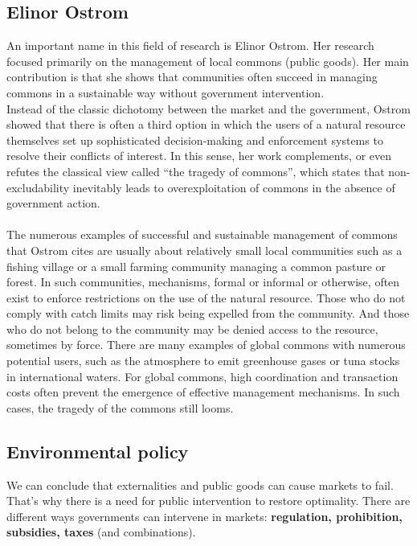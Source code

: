 \documentclass[../summary.tex]{subfiles}
\begin{document}
\subsection{Elinor Ostrom}

An important name in this field of research is Elinor Ostrom. Her research focused primarily on the management of local commons (public goods). Her main contribution is that she shows that communities often succeed in managing commons in a sustainable way without government intervention.
\\
Instead of the classic dichotomy between the market and the government, Ostrom showed that there is often a third option in which the users of a natural resource themselves set up sophisticated decision-making and enforcement systems to resolve their conflicts of interest. In this sense, her work complements, or even refutes the classical view called ``the tragedy of commons'', which states that non-excludability inevitably leads to overexploitation of commons in the absence of government action.
\\\\
The numerous examples of successful and sustainable management of commons that Ostrom cites are usually about relatively small local communities such as a fishing village or a small farming community managing a common pasture or forest. In such communities, mechanisms, formal or informal or otherwise, often exist to enforce restrictions on the use of the natural resource. Those who do not comply with catch limits may risk being expelled from the community. And those who do not belong to the community may be denied access to the resource, sometimes by force. There are many examples of global commons with numerous potential users, such as the atmosphere to emit greenhouse gases or tuna stocks in international waters. For global commons, high coordination and transaction costs often prevent the emergence of effective management mechanisms. In such cases, the tragedy of the commons still looms.

\subsection{Environmental policy}

We can conclude that externalities and public goods can cause markets to fail. That's why there is a need for public intervention to restore optimality. There are different ways governments can intervene in markets: \textbf{regulation, prohibition, subsidies, taxes} (and combinations).
\end{document}
